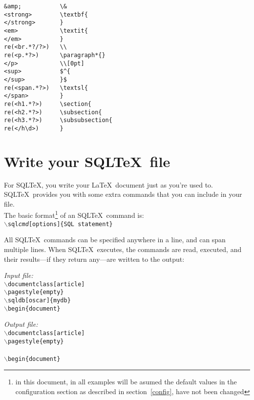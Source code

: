\documentclass{article}
\newcommand{\bs}{\ensuremath{\backslash}}
\newcommand{\vs}{\vspace{3mm}}
\begin{document}
\noindent\begin{verbatim}
&amp;           \&
<strong>        \textbf{
</strong>       }
<em>            \textit{
</em>           }
re(<br.*?/?>)   \\
re(<p.*?>)      \paragraph*{}
</p>            \\[0pt]
<sup>           $^{
</sup>          }$
re(<span.*?>)   \textsl{
</span>         }
re(<h1.*?>)     \section{
re(<h2.*?>)     \subsection{
re(<h3.*?>)     \subsubsection{
re(</h\d>)      }
\end{verbatim}

\section{Write your SQL\TeX\ file}

For SQL\TeX, you write your \LaTeX\ document just as you're used to. SQL\TeX\ provides you with
some extra commands that you can include in your file.\\
The basic format\footnote{in this document, in all examples will be asumed the default values in the
configuration section as described in section~\ref{config}, have not been changed} of an SQL\TeX\ command is: \\
\texttt{\bs sql\emph{cmd}[options]\{SQL statement\}}

\vs

All SQL\TeX\ commands can be specified anywhere in a line, and can span multiple lines.
When SQL\TeX\ executes, the commands are read, executed, and their results---if they return
any---are written to the output:

\vs

\begin{minipage}[t]{0.5\textwidth}\textsl{Input file:}\\\texttt{\footnotesize{\bs documentclass[article] \\
\bs pagestyle\{empty\} \\
\bs sqldb[oscar]\{mydb\} \\
\bs begin\{document\} \\
}}\end{minipage}\hfill\begin{minipage}[t]{0.5\textwidth}\textsl{Output file:}\\\texttt{\footnotesize{\bs documentclass[article] \\
\bs pagestyle\{empty\} \\
 \\
\bs begin\{document\} \\
}}\end{minipage}
\end{document}
